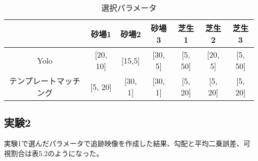 \documentclass[11pt,a4j]{jreport}
\begin{document}
\begin{table}[htbp]
    \centering
    \caption{選択パラメータ}
    \label{tab:sandbox_grass}
    \begin{tabular}{c|cccccc}
                    & 砂場1      & 砂場2     & 砂場3     & 芝生1     & 芝生2     & 芝生3     \\ %
        \hline
        Yolo        & [20, 10] & [15,5]  & [30, 5] & [5, 50] & [20, 5] & [5, 50] \\
        テンプレートマッチング & [5, 20]  & [30, 1] & [30, 1] & [5, 20] & [5, 20] & [5, 20] \\
    \end{tabular}
\end{table}


\subsection{実験2}
実験1で選んだパラメータで追跡映像を作成した結果、勾配と平均二乗誤差、可視割合は表5.2のようになった。\\
\end{document}
